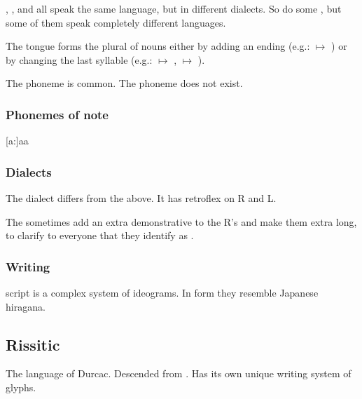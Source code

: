\Mystraacht, \CiriathSepher, \TiphredSerah{} and \Kezerad{} all speak the same language, but in different dialects. 
So do some \Baelzerach, but some of them speak completely different languages. 

The \Resphan{} tongue forms the plural of nouns either by adding an ending (e.g.: \ghobal{} $\mapsto$ \ghobaleth) or by changing the last syllable (e.g.: \resphan{} $\mapsto$ \resphain, \sathariah{} $\mapsto$ \satharioth). 

The phoneme \txipa{[T]} is common. 
The phoneme \txipa{[p]} does not exist. 









\begin{pronunciationenvironment}{\subsubsection{Phonemes of note}}
  \pitem{\ahresphan}   {[a:]}{aa}
  \pitem{\aflatresphan}{[\ae]}{\aumlaut}
\end{pronunciationenvironment}





\subsubsection{Dialects}
The \Mystraacht{} dialect differs from the above. 
It has retroflex on R and L. 

The \CiriathSepher{} sometimes add an extra demonstrative  to the R's and make them extra long, to clarify to everyone that they identify as \CiriathSepher. 





\subsubsection{Writing}
\Resphan{} script is a complex system of ideograms. 
In form they resemble Japanese hiragana. 









\subsection{Rissitic}
The language of Durcac. 
Descended from \Shurco{}. 
Has its own unique writing system of glyphs. 

